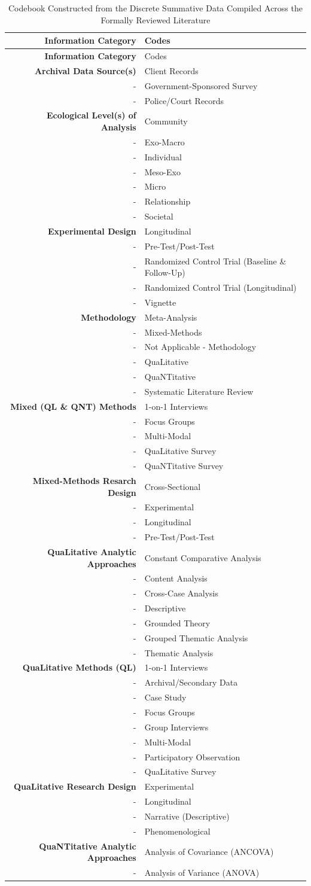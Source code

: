 \documentclass[11pt,]{tufte-book}
\begin{document}
\begin{longtable}[]{@{}rl@{}}
\caption{Codebook Constructed from the Discrete Summative Data Compiled
Across the Formally Reviewed Literature \label{tbl:cdbk}}\tabularnewline
\toprule
\textbf{Information Category} & Codes\tabularnewline
\midrule
\endfirsthead
\toprule
\textbf{Information Category} & Codes\tabularnewline
\midrule
\endhead
\textbf{Archival Data Source(s)} & Client Records\tabularnewline
- & Government-Sponsored Survey\tabularnewline
- & Police/Court Records\tabularnewline
\textbf{Ecological Level(s) of Analysis} & Community\tabularnewline
- & Exo-Macro\tabularnewline
- & Individual\tabularnewline
- & Meso-Exo\tabularnewline
- & Micro\tabularnewline
- & Relationship\tabularnewline
- & Societal\tabularnewline
\textbf{Experimental Design} & Longitudinal\tabularnewline
- & Pre-Test/Post-Test\tabularnewline
- & Randomized Control Trial (Baseline \& Follow-Up)\tabularnewline
- & Randomized Control Trial (Longitudinal)\tabularnewline
- & Vignette\tabularnewline
\textbf{Methodology} & Meta-Analysis\tabularnewline
- & Mixed-Methods\tabularnewline
- & Not Applicable - Methodology\tabularnewline
- & QuaLitative\tabularnewline
- & QuaNTitative\tabularnewline
- & Systematic Literature Review\tabularnewline
\textbf{Mixed (QL \& QNT) Methods} & 1-on-1 Interviews\tabularnewline
- & Focus Groups\tabularnewline
- & Multi-Modal\tabularnewline
- & QuaLitative Survey\tabularnewline
- & QuaNTitative Survey\tabularnewline
\textbf{Mixed-Methods Resarch Design} & Cross-Sectional\tabularnewline
- & Experimental\tabularnewline
- & Longitudinal\tabularnewline
- & Pre-Test/Post-Test\tabularnewline
\textbf{QuaLitative Analytic Approaches} & Constant Comparative
Analysis\tabularnewline
- & Content Analysis\tabularnewline
- & Cross-Case Analysis\tabularnewline
- & Descriptive\tabularnewline
- & Grounded Theory\tabularnewline
- & Grouped Thematic Analysis\tabularnewline
- & Thematic Analysis\tabularnewline
\textbf{QuaLitative Methods (QL)} & 1-on-1 Interviews\tabularnewline
- & Archival/Secondary Data\tabularnewline
- & Case Study\tabularnewline
- & Focus Groups\tabularnewline
- & Group Interviews\tabularnewline
- & Multi-Modal\tabularnewline
- & Participatory Observation\tabularnewline
- & QuaLitative Survey\tabularnewline
\textbf{QuaLitative Research Design} & Experimental\tabularnewline
- & Longitudinal\tabularnewline
- & Narrative (Descriptive)\tabularnewline
- & Phenomenological\tabularnewline
\textbf{QuaNTitative Analytic Approaches} & Analysis of Covariance
(ANCOVA)\tabularnewline
- & Analysis of Variance (ANOVA)\tabularnewline

\end{longtable}
\end{document}
